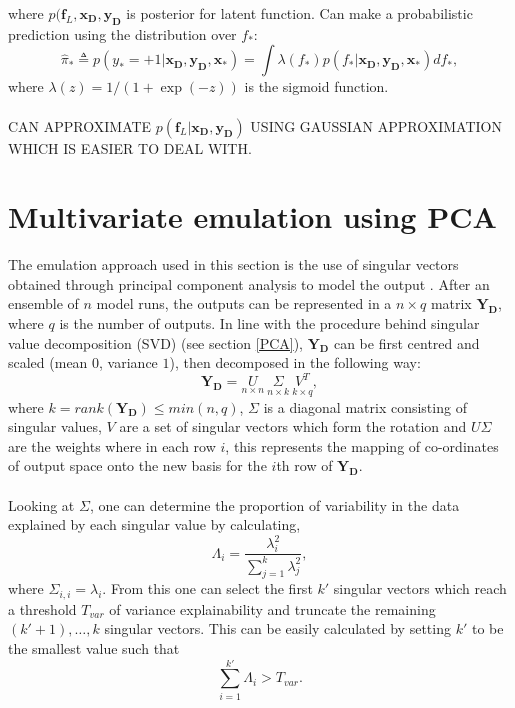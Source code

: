 \documentclass{article}
\newcommand{\numOutputs}{q}
\newcommand{\inputVec}{\mathbf{x}}
\newcommand{\outputVec}{\mathbf{y}}
\newcommand{\designInput}{\inputVec_\design}
\newcommand{\designOutput}{\outputVec_\design}
\newcommand{\design}{\mathbf{D}}
\newcommand{\numDPs}{n}
\newcommand{\LSingVecs}{U}
\newcommand{\RSingVecs}{V}
\newcommand{\singValMat}{\Sigma}
\newcommand{\singVal}{\lambda}
\newcommand{\varExpl}{\Lambda}
\newcommand{\matRank}{k}
\newcommand{\thresh}{T}
\newcommand{\outputMat}{\mathbf{Y}_\design}%
\newcommand{\latent}{\mathbf{f}_L}
\begin{document}
where $p(\latent,\designInput,\designOutput$ is posterior for latent function. Can make a probabilistic prediction using the distribution over $f_*$:
\begin{equation}
    \hat{\pi}_* \triangleq p(y_* = +1|\designInput,\designOutput,\inputVec_*) = \int \lambda(f_*) p(f_*|\designInput,\designOutput,\inputVec_*) d f_*,
\end{equation}
where $\lambda(z) = 1/(1+\exp(-z))$ is the sigmoid function.\\\\
CAN APPROXIMATE $p(\latent|\designInput,\designOutput)$ USING GAUSSIAN APPROXIMATION WHICH IS EASIER TO DEAL WITH.
\section{Multivariate emulation using PCA}
The emulation approach used in this section is the use of singular vectors obtained through principal component analysis to model the output \citep{Wilkinson_2010,Salter2019,Salter2022,Higdon2008,Sexton2012}. After an ensemble of $\numDPs$ model runs, the outputs can be represented in a $\numDPs \times \numOutputs$ matrix $\outputMat$, where $\numOutputs$ is the number of outputs. In line with the procedure behind singular value decomposition (SVD) (see section \ref{PCA}), $\outputMat$ can be first centred and scaled (mean $0$, variance $1$), then decomposed in the following way:
\begin{equation}
    \nonumber
    \outputMat = \underset{\numDPs \times \numDPs}{\LSingVecs} \ \underset{\numDPs \times \matRank}{\singValMat} \ \underset{\matRank \times \numOutputs}{\RSingVecs^T},
\end{equation}
where $\matRank = rank(\outputMat) \leq min(\numDPs,\numOutputs)$, $\singValMat$ is a diagonal matrix consisting of singular values, $\RSingVecs$ are a set of singular vectors which form the rotation and $\LSingVecs \singValMat$ are the weights where in each row $i$, this represents the mapping of co-ordinates of output space onto the new basis for the $i$th row of $\outputMat$.\\\\
Looking at $\singValMat$, one can determine the proportion of variability in the data explained by each singular value by calculating,
\begin{equation}
    \label{eqn:var_expl}
    \varExpl_i = \frac{\singVal_i^2}{\sum_{j=1}^\matRank \singVal_j^2},
\end{equation}
where $\singValMat_{i,i} = \singVal_i$. From this one can select the first $\matRank'$ singular vectors which reach a threshold $\thresh_{var}$ of variance explainability and truncate the remaining $(\matRank'+1),\dots,\matRank$ singular vectors. This can be easily calculated by setting $\matRank'$ to be the smallest value such that \[\sum_{i=1}^{\matRank'} \varExpl_i > \thresh_{var}.\]
\end{document}
